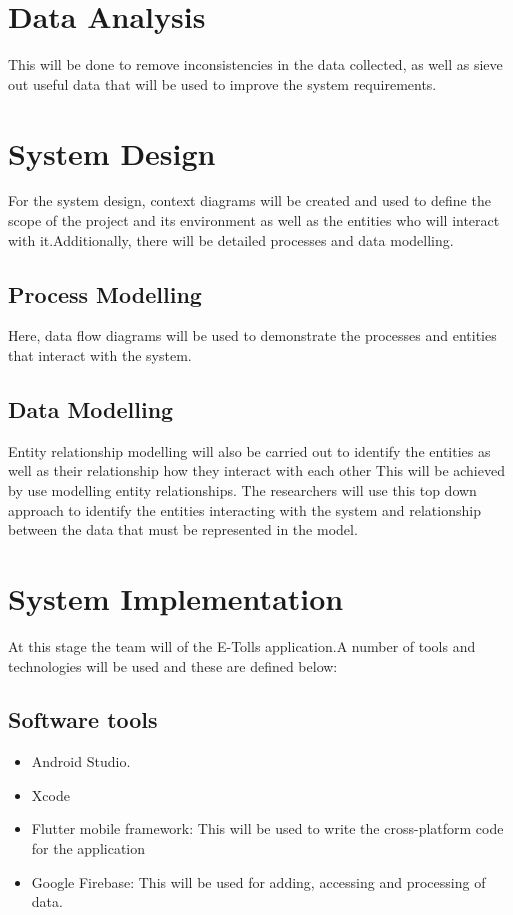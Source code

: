 \section{Data Analysis}
This will be done to remove inconsistencies in the data collected, as well as sieve out useful data that will be used to improve the system requirements.


\section{System Design}
For the system design, context diagrams will be created and used to define the scope of the project and its environment as well as the entities who will interact with it.Additionally, there will be detailed processes and data modelling\cite{rumbaugh_object-oriented_1991}.

\subsection{Process Modelling}
Here, data flow diagrams will be used to demonstrate the processes and entities that interact with the system.

\subsection{Data Modelling}
Entity relationship modelling will also be carried out to identify the entities as well as their relationship how they interact with each other
This will be achieved by use modelling entity relationships. The researchers will use this top down approach to identify the entities interacting with the system and relationship between the data that must be represented in the model.


\section{System Implementation}
At this stage the team will of the E-Tolls application.A number of tools and technologies will be used and these are defined below:

\subsection{Software tools}
\begin{itemize}
    \item  Android Studio.
    \item Xcode
    \item Flutter mobile framework: This will be used to write the cross-platform code for the application
    \item Google Firebase: This will be used for adding, accessing and processing of data.
\end{itemize}

